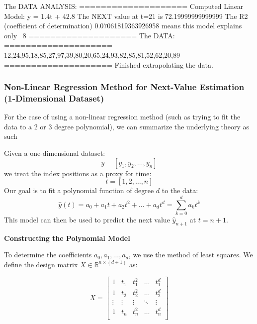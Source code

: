 \documentclass[a4paper, 18pt]{book} %
\begin{document}
 \begin{tcbverbatim}[title=Sample OUTPUT DATA ANALYSIS (Predictive Linear) of Dataset of 20 Random Numbers (Ages)]
The DATA ANALYSIS:
====================
Computed Linear Model: y = 1.4t + 42.8 
The NEXT value at t=21 is 72.19999999999999
The R2 (coefficient of determination) 0.07061819363926958 means this model explains only ~8%
====================
The DATA:
====================
12,24,95,18,85,27,97,39,80,20,65,24,93,82,85,81,52,62,20,89
====================
Finished extrapolating the data.
  \end{tcbverbatim}


\vspace{2em}


\subsubsection{Non-Linear Regression Method for Next-Value Estimation (1-Dimensional Dataset)}

For the case of using a non-linear regression method (such as trying to fit the data to a 2 or 3 degree polynomial), we can summarize the underlying theory as such\cite{copilot_assistant}

\vspace{2em}

Given a one-dimensional dataset:
\[
y = [y_1, y_2, \dots, y_n]
\]
we treat the index positions as a proxy for time:
\[
t = [1, 2, \dots, n]
\]
Our goal is to fit a polynomial function of degree \( d \) to the data:
\[
\hat{y}(t) = a_0 + a_1 t + a_2 t^2 + \dots + a_d t^d = \sum_{k=0}^{d} a_k t^k
\]
This model can then be used to predict the next value \( \hat{y}_{n+1} \) at \( t = n+1 \).

\vspace{2em}

\textbf{Constructing the Polynomial Model}

To determine the coefficients \( a_0, a_1, \dots, a_d \), we use the method of least squares. We define the design matrix \( X \in \mathbb{R}^{n \times (d+1)} \) as:

\[
X = 
\begin{bmatrix}
1 & t_1 & t_1^2 & \dots & t_1^d \\
1 & t_2 & t_2^2 & \dots & t_2^d \\
\vdots & \vdots & \vdots & \ddots & \vdots \\
1 & t_n & t_n^2 & \dots & t_n^d \\
\end{bmatrix}
\]
\end{document}
